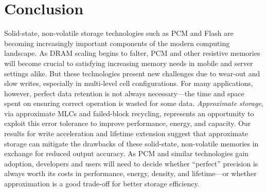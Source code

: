 \section{Conclusion}
\label{approxstorage:sec:conclusion}

Solid-state, non-volatile storage technologies such as PCM and Flash are
becoming increasingly important components of the modern computing landscape.
As DRAM scaling begins to falter, PCM and other resistive memories will become
crucial to satisfying increasing memory needs in mobile and server settings
alike. But these technologies present new challenges due to wear-out and slow
writes, especially in multi-level cell configurations. For many applications,
however, perfect data retention is not always necessary---the time and space
spent on ensuring correct operation is wasted for some data. \emph{Approximate
storage}, via approximate MLCs and failed-block recycling, represents an
opportunity to exploit this error tolerance to improve performance, energy, and
capacity. Our results for write acceleration and lifetime extension suggest
that approximate storage can mitigate the drawbacks of these solid-state,
non-volatile memories in exchange for reduced output accuracy.
As PCM and similar technologies gain adoption, developers and users will need
to decide whether ``perfect'' precision is always worth its costs in
performance, energy, density, and lifetime---or whether approximation is a
good trade-off for better storage efficiency.
